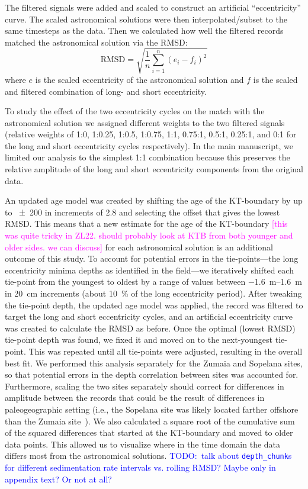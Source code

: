 \documentclass[draft]{agujournal2019}
\newcommand{\rez}{\textcolor{magenta}}
\newcommand{\ijk}{\textcolor{blue}}
\begin{document}
The filtered signals were added and scaled to construct an artificial ``eccentricity'' curve.
The scaled astronomical solutions were then interpolated/subset to the same timesteps as the data.
Then we calculated how well the filtered records matched the astronomical solution via the \gls{RMSD}:
\begin{equation}\label{eqn:rmsd}
    \text{RMSD} = \sqrt{\frac{1}{n}\sum_{i=1}^{n}(e_{i} - f_{i})^{2}}
\end{equation}
where \(e\) is the scaled eccentricity of the astronomical solution and \(f\) is the scaled and filtered combination of long- and short eccentricity.

To study the effect of the two eccentricity cycles on the match with the astronomical solution
we assigned different weights to the two filtered signals
(relative weights of 1:0, 1:0.25, 1:0.5, 1:0.75, 1:1, 0.75:1, 0.5:1, 0.25:1, and 0:1 for the long and short eccentricity cycles respectively).
In the main manuscript, we limited our analysis to the simplest 1:1 combination because this preserves the relative amplitude of the long and short eccentricity components from the original data.

An updated age model was created by shifting the age of the \gls{KT}-boundary
by up to \qty{\pm200}{\kiloyear} in increments of \qty{2.8}{\kiloyear}
and selecting the offset that gives the lowest \gls{RMSD}.
This means that a new estimate for the age of the \gls{KT}-boundary
\rez{[this was quite tricky in ZL22. should probably look
at KTB from both younger and older sides. we can discuss]}
for each astronomical solution is an additional outcome of this study.
To account for potential errors in the tie-points---the long eccentricity minima depths as identified in the field---we iteratively shifted each tie-point from the youngest to oldest by a range of values between \qtyrange[range-phrase=~to~]{-1.6}{1.6}{\metre} in \qty{20}{\centi\metre} increments (about \qty{10}{\percent} of the long eccentricity period).
After tweaking the tie-point depth, the updated age model was applied, the record was filtered to target the long and short eccentricity cycles, and an artificial eccentricity curve was created to calculate the \gls{RMSD} as before.
Once the optimal (lowest \gls{RMSD}) tie-point depth was found, we fixed it and moved on to the next-youngest tie-point.
This was repeated until all tie-points were adjusted, resulting in the overall best fit.
We performed this analysis separately for the Zumaia and Sopelana sites, so that potential errors in the depth correlation between sites was accounted for.
Furthermore,  scaling the two sites separately should correct for differences in amplitude between the records that could be the result of differences in paleogeographic setting (i.e., the Sopelana site was likely located farther offshore than the Zumaia site~\cite{Batenburg2014}).
We also calculated a square root of the cumulative sum of the squared differences that started at the \gls{KT}-boundary and moved to older data points.
This allowed us to visualize where in the time domain the data differs most from the astronomical solutions.
\ijk{TODO:\ talk about \texttt{depth\_chunk}s for different sedimentation rate intervals vs. rolling RMSD? Maybe only in appendix text? Or not at all?}
\end{document}
